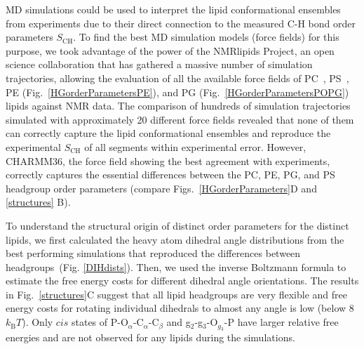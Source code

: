 \documentclass[journal=jpcbfk,manuscript=article]{achemso}
\begin{document}
MD simulations could be used to interpret the lipid conformational ensembles from experiments due to their direct connection to the measured C-H bond order parameters $S_\mathrm{CH}$. To find the best MD simulation models (force fields) for this purpose, we took advantage of the power of the NMRlipids Project, an open science collaboration that has gathered a massive number of simulation trajectories, allowing the evaluation of all the available force fields of PC~\cite{botan15}, PS~\cite{antila19}, PE (Fig.~\ref{HGorderParametersPE}), and PG (Fig.~\ref{HGorderParametersPOPG}) lipids against NMR data. The comparison of hundreds of simulation trajectories simulated with approximately 20 different force fields revealed that none of them can correctly capture the lipid conformational ensembles and reproduce the experimental $S_\mathrm{CH}$ of all segments within experimental error. However, CHARMM36, the force field showing the best agreement with experiments, correctly captures the essential differences between the PC, PE, PG, and PS headgroup order parameters (compare Figs.~\ref{HGorderParameters}D and \ref{structures} B). 

To understand the structural origin of distinct order parameters for the distinct lipids,
we first calculated the heavy atom dihedral angle distributions from the best performing simulations that reproduced the differences between headgroups~(Fig. \ref{DIHdists}).
Then, we used the inverse Boltzmann formula to estimate the free
energy costs for different dihedral angle orientations.
The results in Fig.~\ref{structures}C suggest that all lipid headgroups are very flexible and free
energy costs for rotating individual dihedrals to almost any angle is low (below 8~$k_\mathrm{B}T$).
Only $cis$ states of P-O$_\alpha$-C$_\alpha$-C$_\beta$ and g$_2$-g$_3$-O$_{g_3}$-P have larger relative free
energies and are not observed for any lipids during the simulations.
\end{document}
